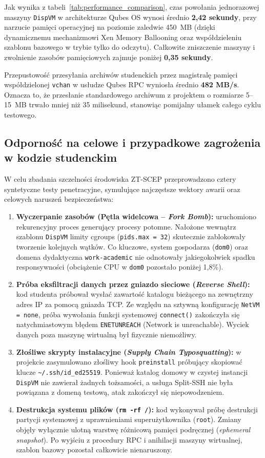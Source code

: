 Jak wynika z tabeli~\ref{tab:performance_comparison}, czas powołania jednorazowej maszyny \texttt{DispVM} w architekturze Qubes OS wynosi średnio \textbf{2,42 sekundy}, przy narzucie pamięci operacyjnej na poziomie zaledwie 450~MB (dzięki dynamicznemu mechanizmowi Xen Memory Ballooning oraz współdzieleniu szablonu bazowego w trybie tylko do odczytu). Całkowite zniszczenie maszyny i zwolnienie zasobów pamięciowych zajmuje poniżej \textbf{0,35 sekundy}.

Przepustowość przesyłania archiwów studenckich przez magistralę pamięci współdzielonej \texttt{vchan} w usłudze Qubes RPC wyniosła średnio \textbf{482 MB/s}. Oznacza to, że przesłanie standardowego archiwum z projektem o rozmiarze 5--15~MB trwało mniej niż 35 milisekund, stanowiąc pomijalny ułamek całego cyklu testowego.

\subsection{Odporność na celowe i przypadkowe zagrożenia w kodzie studenckim}
W celu zbadania szczelności środowiska ZT-SCEP przeprowadzono cztery syntetyczne testy penetracyjne, symulujące najczęstsze wektory awarii oraz celowych naruszeń bezpieczeństwa:

\begin{enumerate}
    \item \textbf{Wyczerpanie zasobów (Pętla widelcowa -- \textit{Fork Bomb}):} uruchomiono rekurencyjny proces generujący procesy potomne. Nałożone wewnątrz szablonu \texttt{DispVM} limity cgroups (\texttt{pids.max = 32}) skutecznie zablokowały tworzenie kolejnych wątków. Co kluczowe, system gospodarza (\texttt{dom0}) oraz domena dydaktyczna \texttt{work-academic} nie odnotowały jakiegokolwiek spadku responsywności (obciążenie CPU w \texttt{dom0} pozostało poniżej 1,8\%).
    \item \textbf{Próba eksfiltracji danych przez gniazdo sieciowe (\textit{Reverse Shell}):} kod studenta próbował wysłać zawartość katalogu bieżącego na zewnętrzny adres IP za pomocą gniazda TCP. Ze względu na sztywną konfigurację \texttt{NetVM = none}, próba wywołania funkcji systemowej \texttt{connect()} zakończyła się natychmiastowym błędem \texttt{ENETUNREACH} (Network is unreachable). Wyciek danych poza maszynę wirtualną był fizycznie niemożliwy.
    \item \textbf{Złośliwe skrypty instalacyjne (\textit{Supply Chain Typosquatting}):} w projekcie zasymulowano złośliwy hook \texttt{preinstall} próbujący skopiować klucze \texttt{\textasciitilde/.ssh/id\_ed25519}. Ponieważ katalog domowy w czystej instancji \texttt{DispVM} nie zawierał żadnych tożsamości, a usługa Split-SSH nie była powiązana z domeną testową, atak zakończył się niepowodzeniem.
    \item \textbf{Destrukcja systemu plików (\texttt{rm -rf /}):} kod wykonywał próbę destrukcji partycji systemowej z uprawnieniami superużytkownika (\texttt{root}). Zmiany objęły wyłącznie ulotną warstwę różnicową pamięci podręcznej (\textit{ephemeral snapshot}). Po wyjściu z procedury RPC i anihilacji maszyny wirtualnej, szablon bazowy pozostał całkowicie nienaruszony.
\end{enumerate}

